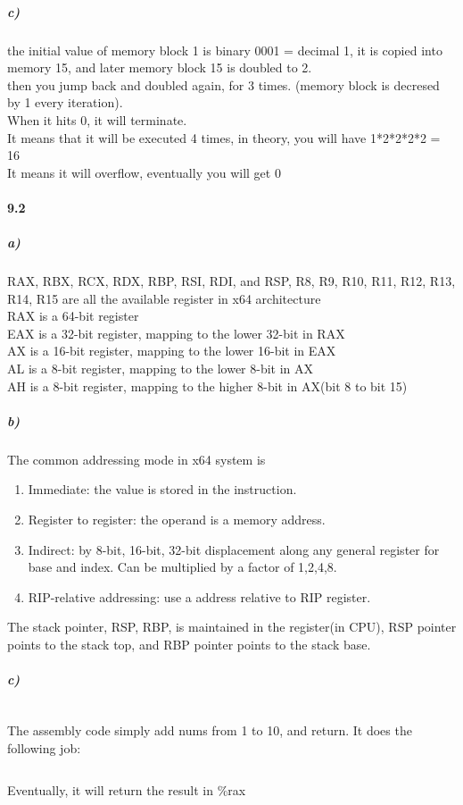 \documentclass{article}
\begin{document}
\subparagraph{c)}
the initial value of memory block 1 is binary 0001 = decimal 1, it is copied into memory 15, and later memory block 15 is doubled to 2. \\
then you jump back and doubled again, for 3 times. (memory block is decresed by 1 every iteration). \\
When it hits 0, it will terminate. \\
It means that it will be executed 4 times, in theory, you will have 1*2*2*2*2 = 16 \\
It means it will overflow, eventually you will get 0 \\
\paragraph{9.2}
\subparagraph{a)}
RAX, RBX, RCX, RDX, RBP, RSI, RDI, and RSP, R8, R9, R10, R11, R12, R13, R14, R15 are all the available register in x64 architecture \\
RAX is a 64-bit register\\
EAX is a 32-bit register, mapping to the lower 32-bit in RAX\\
AX is a 16-bit register, mapping to the lower 16-bit in EAX\\
AL is a 8-bit register, mapping to the lower 8-bit in AX\\
AH is a 8-bit register, mapping to the higher 8-bit in AX(bit 8 to bit 15)\\
\subparagraph{b)}
The common addressing mode in x64 system is
\begin{enumerate}
    \item Immediate: the value is stored in the instruction.
    \item Register to register: the operand is a memory address.
    \item Indirect: by 8-bit, 16-bit, 32-bit displacement along any general register for base and index.
        Can be multiplied by a factor of 1,2,4,8.
    \item RIP-relative addressing: use a address relative to RIP register.
\end{enumerate}
The stack pointer, RSP, RBP, is maintained in the register(in CPU), RSP pointer points to the stack top, and RBP pointer points to the stack base. \\
\subparagraph{c)}
\inputminted{nasm}{code.asm}
The assembly code simply add nums from 1 to 10, and return.
It does the following job:
\inputminted{c}{code.c}
Eventually, it will return the result in \%rax
\end{document}
